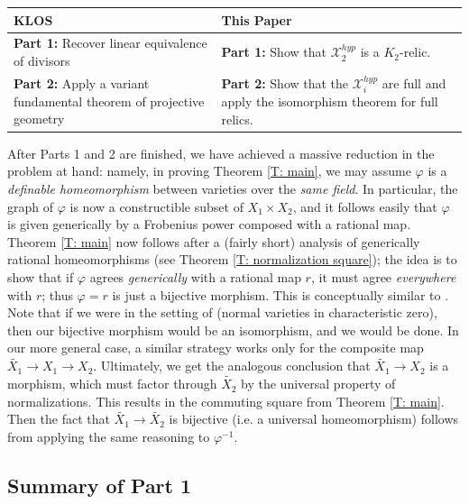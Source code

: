 \documentclass{amsart}
\theoremstyle{definition}
\begin{document}
\begin{table}[h]
\centering
\renewcommand{\arraystretch}{1.3}
\begin{tabular}{|p{}|p{}|}
\hline
\textbf{KLOS} & \textbf{This Paper} \\
\hline
\textbf{Part 1:} Recover linear equivalence of divisors
&
\textbf{Part 1:} Show that $\mathcal X_2^{hyp}$ is a $K_2$-relic.
\\
\hline
\textbf{Part 2:} Apply a variant fundamental theorem of projective geometry
&
\textbf{Part 2:} Show that the $\mathcal X_i^{hyp}$ are full and apply the isomorphism theorem for full relics.
\\
\hline
\end{tabular}
\end{table}

After Parts 1 and 2 are finished, we have achieved a massive reduction in the problem at hand: namely, in proving Theorem \ref{T: main}, we may assume $\varphi$ is a \textit{definable homeomorphism} between varieties over the \textit{same field}. In particular, the graph of $\varphi$ is now a constructible subset of $X_1\times X_2$, and it follows easily that $\varphi$ is given generically by a Frobenius power composed with a rational map. Theorem \ref{T: main} now follows after a (fairly short) analysis of generically rational homeomorphisms (see Theorem \ref{T: normalization square}); the idea is to show that if $\varphi$ agrees \textit{generically} with a rational map $r$, it must agree \textit{everywhere} with $r$; thus $\varphi=r$ is just a bijective morphism. This is conceptually similar to \cite[Section 5.1]{KLOS}. Note that if we were in the setting of \cite{KLOS} (normal varieties in characteristic zero), then our bijective morphism would be an isomorphism, and we would be done. In our more general case, a similar strategy works only for the composite map $\widetilde{X_1}\rightarrow X_1\rightarrow X_2$. Ultimately, we get the analogous conclusion that $\widetilde{X_1}\rightarrow X_2$ is a morphism, which must factor through $\widetilde{X_2}$ by the universal property of normalizations. This results in the commuting square from Theorem \ref{T: main}. Then the fact that $\widetilde{X_1}\rightarrow\widetilde{X_2}$ is bijective (i.e. a universal homeomorphism) follows from applying the same reasoning to $\varphi^{-1}$.

\subsection{Summary of Part 1}
\end{document}
